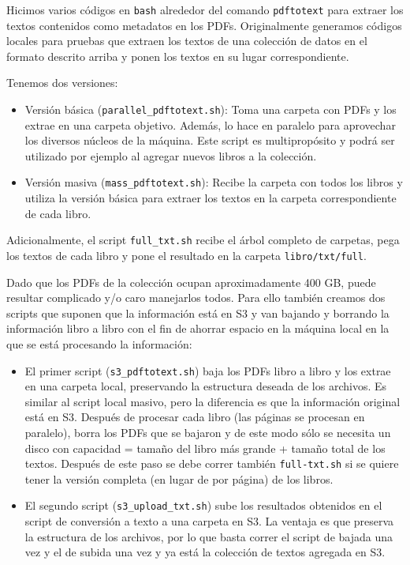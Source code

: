 Hicimos varios códigos en \texttt{bash} alrededor del comando
\texttt{pdftotext} para extraer los textos contenidos como metadatos en
los PDFs. Originalmente generamos códigos locales para pruebas que
extraen los textos de una colección de datos en el formato descrito
arriba y ponen los textos en su lugar correspondiente.

Tenemos dos versiones:

\begin{itemize}
\item
  Versión básica (\texttt{parallel\_pdftotext.sh}): Toma una carpeta con
  PDFs y los extrae en una carpeta objetivo. Además, lo hace en paralelo
  para aprovechar los diversos núcleos de la máquina. Este script es
  multipropósito y podrá ser utilizado por ejemplo al agregar nuevos
  libros a la colección.
\item
  Versión masiva (\texttt{mass\_pdftotext.sh}): Recibe la carpeta con
  todos los libros y utiliza la versión básica para extraer los textos
  en la carpeta correspondiente de cada libro.
\end{itemize}

Adicionalmente, el script \texttt{full\_txt.sh} recibe el árbol completo
de carpetas, pega los textos de cada libro y pone el resultado en la
carpeta \texttt{libro/txt/full}.

Dado que los PDFs de la colección ocupan aproximadamente 400 GB, puede
resultar complicado y/o caro manejarlos todos. Para ello también creamos
dos scripts que suponen que la información está en S3 y van bajando y
borrando la información libro a libro con el fin de ahorrar espacio en
la máquina local en la que se está procesando la información:

\begin{itemize}
\item
  El primer script (\texttt{s3\_pdftotext.sh}) baja los PDFs libro a
  libro y los extrae en una carpeta local, preservando la estructura
  deseada de los archivos. Es similar al script local masivo, pero la
  diferencia es que la información original está en S3. Después de
  procesar cada libro (las páginas se procesan en paralelo), borra los
  PDFs que se bajaron y de este modo sólo se necesita un disco con
  capacidad = tamaño del libro más grande + tamaño total de los textos.
  Después de este paso se debe correr también \texttt{full-txt.sh} si se
  quiere tener la versión completa (en lugar de por página) de los
  libros.
\item
  El segundo script (\texttt{s3\_upload\_txt.sh}) sube los resultados
  obtenidos en el script de conversión a texto a una carpeta en S3. La
  ventaja es que preserva la estructura de los archivos, por lo que
  basta correr el script de bajada una vez y el de subida una vez y ya
  está la colección de textos agregada en S3.
\end{itemize}

